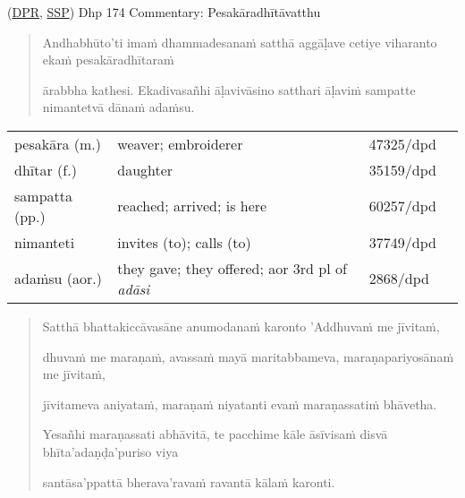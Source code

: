 \documentclass[11pt,oneside]{memoir}
\begin{document}
(\href{https://www.digitalpalireader.online/\_dprhtml/index.html?loc=k.1.0.1.4.6.x.a}{DPR}, \href{http://localhost:4848/suttas/s0502a.att/pli/cst4?quote=andhabh\%25C5\%25ABtoti\%2520ima\%25E1\%25B9\%2581\%2520dhammadesana\%25E1\%25B9\%2581\&window\_type=Sutta+Study}{SSP}) Dhp 174 Commentary: Pesakāradhītāvatthu

\begin{quote}
Andhabhūto'ti imaṁ dhammadesanaṁ satthā aggāḷave cetiye viharanto ekaṁ pesakāradhītaraṁ

ārabbha kathesi. Ekadivasañhi āḷavivāsino satthari āḷaviṁ sampatte nimantetvā dānaṁ adaṁsu.
\end{quote}

\begin{longtable}{L{\colOne} L{\colTwo} H H}
pesakāra (m.) & weaver; embroiderer & 47325/dpd & \\[0pt]
dhītar (f.) & daughter & 35159/dpd & \\[0pt]
sampatta (pp.) & reached; arrived; is here & 60257/dpd & \\[0pt]
nimanteti & invites (to); calls (to) & 37749/dpd & \\[0pt]
adaṁsu (aor.) & they gave; they offered; aor 3rd pl of \emph{adāsi} & 2868/dpd & \\[0pt]
\end{longtable}

\clearpage
\casesLegendHeaderBGHere

\begin{quote}
Satthā bhattakiccāvasāne anumodanaṁ karonto 'Addhuvaṁ me jīvitaṁ,

dhuvaṁ me maraṇaṁ, avassaṁ mayā maritabbameva, maraṇapariyosānaṁ me jīvitaṁ,

jīvitameva aniyataṁ, maraṇaṁ niyatanti evaṁ maraṇassatiṁ bhāvetha.

Yesañhi maraṇassati abhāvitā, te pacchime kāle āsīvisaṁ disvā bhīta'adaṇḍa'puriso viya

santāsa'ppattā bherava'ravaṁ ravantā kālaṁ karonti.
\end{quote}

\vspace*{-1pt}
\end{document}
